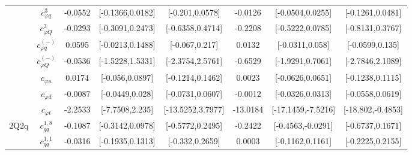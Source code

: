 \documentclass{article}
\begin{document}
\begin{table}[H]
\begin{tabular}{|c|c|c|c|c|c|c|c|}
 & $c_{\varphi q}^{3}$ & -0.0552                             & [-0.1366,0.0182]                                 & [-0.201,0.0578] & -0.0126                             & [-0.0504,0.0255]                                 & [-0.1261,0.0481] \\ \cline{2-8}
 & $c_{\varphi Q}^{3}$ & -0.0293                             & [-0.3091,0.2473]                                 & [-0.6358,0.4714] & -0.2208                             & [-0.5222,0.0785]                                 & [-0.8131,0.3767] \\ \cline{2-8}
 & $c_{\varphi q}^{(-)}$ & 0.0595                             & [-0.0213,0.1488]                                 & [-0.067,0.217] & 0.0132                             & [-0.0311,0.058]                                 & [-0.0599,0.135] \\ \cline{2-8}
 & $c_{\varphi Q}^{(-)}$ & -0.0536                             & [-1.5228,1.5331]                                 & [-2.3754,2.5761] & -0.6529                             & [-1.9291,0.7061]                                 & [-2.7846,2.1089] \\ \cline{2-8}
 & $c_{\varphi u}$ & 0.0174                             & [-0.056,0.0897]                                 & [-0.1214,0.1462] & 0.0023                             & [-0.0626,0.0651]                                 & [-0.1238,0.1115] \\ \cline{2-8}
 & $c_{\varphi d}$ & -0.0087                             & [-0.0449,0.028]                                 & [-0.0731,0.0607] & -0.0012                             & [-0.0326,0.0313]                                 & [-0.0558,0.0619] \\ \cline{2-8}
 & $c_{\varphi t}$ & -2.2533                             & [-7.7508,2.235]                                 & [-13.5252,3.7977] & -13.0184                             & [-17.1459,-7.5216]                                 & [-18.802,-0.4853] \\ \cline{2-8}
\hline
\multirow{14}{*}{2Q2q}
 & $c_{qq}^{1,8}$ & -0.1087                             & [-0.3142,0.0978]                                 & [-0.5772,0.2495] & -0.2422                             & [-0.4563,-0.0291]                                 & [-0.6737,0.1671] \\ \cline{2-8}
 & $c_{qq}^{1,1}$ & -0.0316                             & [-0.1935,0.1313]                                 & [-0.332,0.2659] & 0.0003                             & [-0.1162,0.1161]                                 & [-0.2225,0.2155] \\ \cline{2-8}

\end{tabular}
\end{table}
\end{document}
